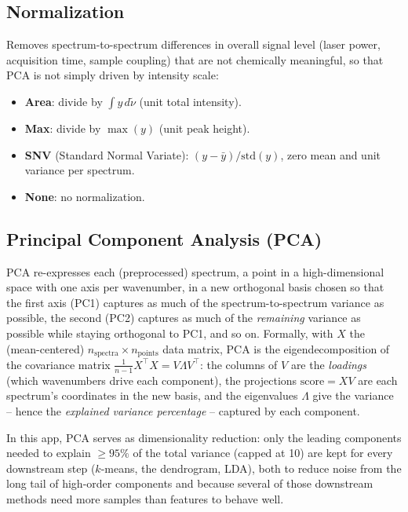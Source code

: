 \documentclass[11pt,a4paper]{article}
\begin{document}
\subsection{Normalization}
\label{sec:normalize}
Removes spectrum-to-spectrum differences in overall signal level (laser
power, acquisition time, sample coupling) that are not chemically
meaningful, so that PCA is not simply driven by intensity scale:
\begin{itemize}
  \item \textbf{Area}: divide by $\int y\, d\tilde\nu$ (unit total
  intensity).
  \item \textbf{Max}: divide by $\max(y)$ (unit peak height).
  \item \textbf{SNV} (Standard Normal Variate): $(y-\bar y)/\mathrm{std}(y)$,
  zero mean and unit variance per spectrum.
  \item \textbf{None}: no normalization.
\end{itemize}

\subsection{Principal Component Analysis (PCA)}
\label{sec:pca}
PCA re-expresses each (preprocessed) spectrum, a point in a
high-dimensional space with one axis per wavenumber, in a new orthogonal
basis chosen so that the first axis (PC1) captures as much of the
spectrum-to-spectrum variance as possible, the second (PC2) captures as much
of the \emph{remaining} variance as possible while staying orthogonal to
PC1, and so on. Formally, with $X$ the (mean-centered) $n_{\text{spectra}}
\times n_{\text{points}}$ data matrix, PCA is the eigendecomposition of the
covariance matrix $\tfrac{1}{n-1}X^\top X = V\Lambda V^\top$: the columns of
$V$ are the \emph{loadings} (which wavenumbers drive each component), the
projections $\text{score} = XV$ are each spectrum's coordinates in the new
basis, and the eigenvalues $\Lambda$ give the variance -- hence the
\emph{explained variance percentage} -- captured by each component.

In this app, PCA serves as dimensionality reduction: only the leading
components needed to explain $\geq 95\%$ of the total variance (capped at
10) are kept for every downstream step ($k$-means, the dendrogram, LDA),
both to reduce noise from the long tail of high-order components and
because several of those downstream methods need more samples than
features to behave well.
\end{document}
